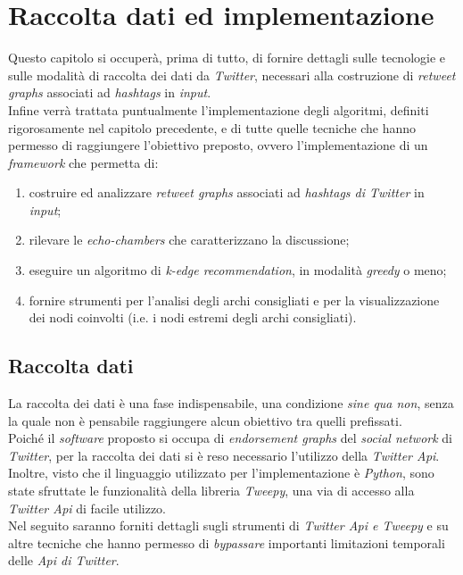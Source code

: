 \chapter{Raccolta dati ed implementazione}
\label{chap:implementazione}

Questo capitolo si occuperà, prima di tutto, di fornire dettagli sulle tecnologie e sulle modalità di raccolta dei dati da \textit{Twitter}, necessari alla costruzione di \textit{retweet graphs} associati ad \textit{hashtags} in \textit{input}.
\\Infine verrà trattata puntualmente l'implementazione degli algoritmi, definiti rigorosamente nel capitolo precedente, e di tutte quelle tecniche che hanno permesso di raggiungere l'obiettivo preposto, ovvero l'implementazione di un \textit{framework} che permetta di:
\begin{enumerate}
\item costruire ed analizzare \textit{retweet graphs} associati ad \textit{hashtags di Twitter} in \textit{input};
\item rilevare le \textit{echo-chambers} che caratterizzano la discussione;
\item eseguire un algoritmo di \textit{k-edge recommendation}, in modalità \textit{greedy} o meno;
\item fornire strumenti per l'analisi degli archi consigliati e per la visualizzazione dei nodi coinvolti (i.e. i nodi estremi degli archi consigliati).  
\end{enumerate}

\section{Raccolta dati}
La raccolta dei dati è una fase indispensabile, una condizione \textit{sine qua non}, senza la quale non è pensabile raggiungere alcun obiettivo tra quelli prefissati.
\\Poiché il \textit{software} proposto si occupa di \textit{endorsement graphs} del \textit{social network} di \textit{Twitter}, per la raccolta dei dati si è reso necessario l'utilizzo della \textit{Twitter Api}. Inoltre, visto che il linguaggio utilizzato per l'implementazione è \textit{Python}, sono state sfruttate le funzionalità della libreria \textit{Tweepy}, una via di accesso alla \textit{Twitter Api} di facile utilizzo. 
\\Nel seguito saranno forniti dettagli sugli strumenti di \textit{Twitter Api e Tweepy} e su altre tecniche che hanno permesso di \textit{bypassare} importanti limitazioni temporali delle \textit{Api di Twitter}.  

